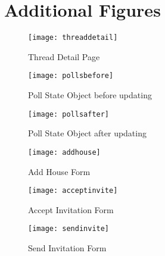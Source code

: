 \chapter{Additional Figures}
\begin{figure}
    \begin{center}
    \texttt{[image: threaddetail]}
    \end{center}
    \caption{Thread Detail Page}
    \label{fig:threaddetail}
\end{figure}

\begin{figure}
    \begin{center}
    \texttt{[image: pollsbefore]}
    \end{center}
    \caption{Poll State Object before updating}
    \label{fig:pollsbefore}
\end{figure}

\begin{figure}
    \begin{center}
    \texttt{[image: pollsafter]}
    \end{center}
    \caption{Poll State Object after updating}
    \label{fig:pollsafter}
\end{figure}

\begin{figure}
    \begin{center}
    \texttt{[image: addhouse]}
    \end{center}
    \caption{Add House Form}
    \label{fig:addhouse}
\end{figure}

\begin{figure}
    \begin{center}
    \texttt{[image: acceptinvite]}
    \end{center}
    \caption{Accept Invitation Form}
    \label{fig:acceptinvite}
\end{figure}

\begin{figure}
    \begin{center}
    \texttt{[image: sendinvite]}
    \end{center}
    \caption{Send Invitation Form}
    \label{fig:sendinvite}
\end{figure}




